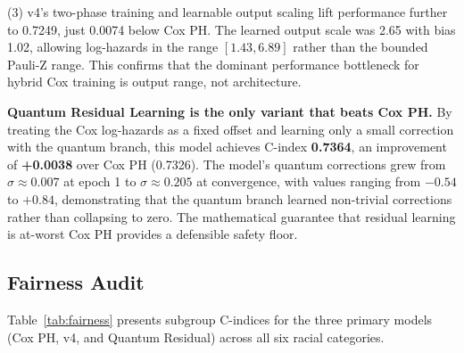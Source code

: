 \documentclass[12pt, letterpaper]{article}
\begin{document}
(3) v4's two-phase training and learnable output scaling lift performance further to 0.7249, just 0.0074 below Cox PH. The learned output scale was 2.65 with bias 1.02, allowing log-hazards in the range $[1.43, 6.89]$ rather than the bounded Pauli-Z range. This confirms that the dominant performance bottleneck for hybrid Cox training is output range, not architecture.

\textbf{Quantum Residual Learning is the only variant that beats Cox PH.} By treating the Cox log-hazards as a fixed offset and learning only a small correction with the quantum branch, this model achieves C-index \textbf{0.7364}, an improvement of \textbf{+0.0038} over Cox PH (0.7326). The model's quantum corrections grew from $\sigma \approx 0.007$ at epoch 1 to $\sigma \approx 0.205$ at convergence, with values ranging from $-0.54$ to $+0.84$, demonstrating that the quantum branch learned non-trivial corrections rather than collapsing to zero. The mathematical guarantee that residual learning is at-worst Cox PH provides a defensible safety floor.

\subsection{Fairness Audit}

Table~\ref{tab:fairness} presents subgroup C-indices for the three primary models (Cox PH, v4, and Quantum Residual) across all six racial categories.
\end{document}
